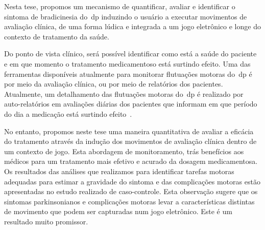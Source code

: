 Nesta tese, propomos um mecanismo de quantificar, avaliar e identificar o sintoma de bradicinesia do~\ac{dp} induzindo o usuário a executar movimentos de avaliação clínica, de uma forma lúdica e integrada a um jogo eletrônico e longe do contexto de tratamento da saúde.

Do ponto de vista clínico, será possível identificar como está a saúde do paciente e em que momento o tratamento medicamentoso está surtindo efeito. Uma das ferramentas disponíveis atualmente para monitorar flutuações motoras do~\ac{dp} é por meio da avaliação clínica, ou por meio de relatórios dos pacientes. Atualmente, um detalhamento das flutuações motoras do~\ac{dp} é realizado por auto-relatórios em avaliações diárias dos pacientes que informam em que período do dia a medicação está surtindo efeito~\cite{reviewassesenspark2015}.

No entanto, propomos neste tese uma maneira quantitativa de avaliar a eficácia do tratamento através da indução dos movimentos de avaliação clínica dentro de um contexto de jogo. Esta abordagem de monitoramento, trás benefícios aos médicos para um tratamento mais efetivo e acurado da dosagem medicamentosa. Os resultados das análises que realizamos para identificar tarefas motoras adequadas para estimar a gravidade do sintoma e das complicações motoras estão apresentadas no estudo realizado de caso-controle. Esta observação sugere que os sintomas parkinsonianos e complicações motoras levar a características distintas de movimento que podem ser capturadas num jogo eletrônico. Este é um resultado muito promissor.


